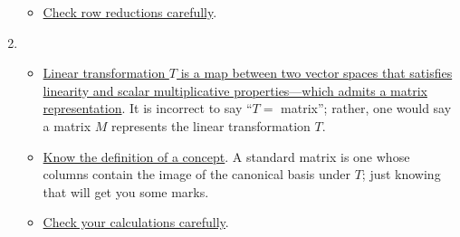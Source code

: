 \documentclass[answers,11pt]{exam}
\theoremstyle{definition}
\theoremstyle{definition}
\DeclareMathOperator{\1}{\mathbbm{1}}
\begin{document}
\begin{enumerate}
\begin{itemize}
		\item \uline{Check row reductions carefully}.
	\end{itemize}


	\item \begin{itemize}
		\item \uline{Linear transformation $T$ is a map between two vector spaces that satisfies linearity and scalar multiplicative properties---which admits a matrix representation}. It is incorrect to say ``$T = $ matrix''; rather, one would say a matrix $M$ represents the linear transformation $T$.
		
		
		\item \uline{Know the definition of a concept}. A standard matrix is one whose columns contain the image of the canonical basis under $T$; just knowing that will get you some marks.
		
		
		\item \uline{Check your calculations carefully}.
	\end{itemize}
\end{enumerate}
\end{document}
